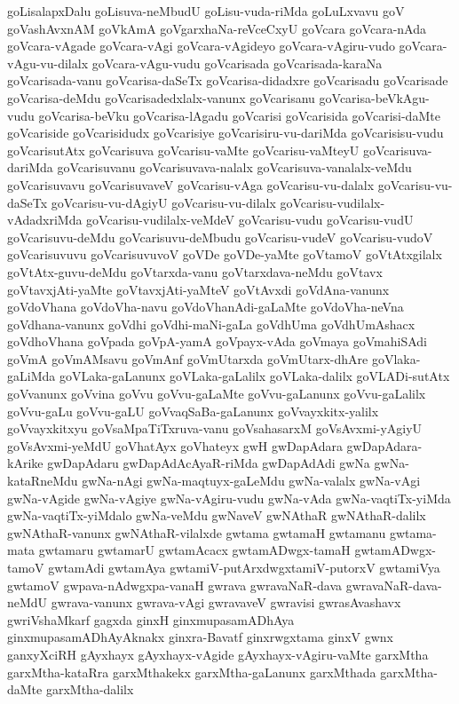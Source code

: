 {goLisalapxDalu
goLisuva-neMbudU
goLisu-vuda-riMda
goLuLxvavu
goV
goVashAvxnAM
goVkAmA
goVgarxhaNa-reVceCxyU
goVcara
goVcara-nAda
goVcara-vAgade
goVcara-vAgi
goVcara-vAgideyo
goVcara-vAgiru-vudo
goVcara-vAgu-vu-dilalx
goVcara-vAgu-vudu
goVcarisada
goVcarisada-karaNa
goVcarisada-vanu
goVcarisa-daSeTx
goVcarisa-didadxre
goVcarisadu
goVcarisade
goVcarisa-deMdu
goVcarisadedxlalx-vanunx
goVcarisanu
goVcarisa-beVkAgu-vudu
goVcarisa-beVku
goVcarisa-lAgadu
goVcarisi
goVcarisida
goVcarisi-daMte
goVcariside
goVcarisidudx
goVcarisiye
goVcarisiru-vu-dariMda
goVcarisisu-vudu
goVcarisutAtx
goVcarisuva
goVcarisu-vaMte
goVcarisu-vaMteyU
goVcarisuva-dariMda
goVcarisuvanu
goVcarisuvava-nalalx
goVcarisuva-vanalalx-veMdu
goVcarisuvavu
goVcarisuvaveV
goVcarisu-vAga
goVcarisu-vu-dalalx
goVcarisu-vu-daSeTx
goVcarisu-vu-dAgiyU
goVcarisu-vu-dilalx
goVcarisu-vudilalx-vAdadxriMda
goVcarisu-vudilalx-veMdeV
goVcarisu-vudu
goVcarisu-vudU
goVcarisuvu-deMdu
goVcarisuvu-deMbudu
goVcarisu-vudeV
goVcarisu-vudoV
goVcarisuvuvu
goVcarisuvuvoV
goVDe
goVDe-yaMte
goVtamoV
goVtAtxgilalx
goVtAtx-guvu-deMdu
goVtarxda-vanu
goVtarxdava-neMdu
goVtavx
goVtavxjAti-yaMte
goVtavxjAti-yaMteV
goVtAvxdi
goVdAna-vanunx
goVdoVhana
goVdoVha-navu
goVdoVhanAdi-gaLaMte
goVdoVha-neVna
goVdhana-vanunx
goVdhi
goVdhi-maNi-gaLa
goVdhUma
goVdhUmAshacx
goVdhoVhana
goVpada
goVpA-yamA
goVpayx-vAda
goVmaya
goVmahiSAdi
goVmA
goVmAMsavu
goVmAnf
goVmUtarxda
goVmUtarx-dhAre
goVlaka-gaLiMda
goVLaka-gaLanunx
goVLaka-gaLalilx
goVLaka-dalilx
goVLADi-sutAtx
goVvanunx
goVvina
goVvu
goVvu-gaLaMte
goVvu-gaLanunx
goVvu-gaLalilx
goVvu-gaLu
goVvu-gaLU
goVvaqSaBa-gaLanunx
goVvayxkitx-yalilx
goVvayxkitxyu
goVsaMpaTiTxruva-vanu
goVsahasarxM
goVsAvxmi-yAgiyU
goVsAvxmi-yeMdU
goVhatAyx
goVhateyx
gwH
gwDapAdara
gwDapAdara-kArike
gwDapAdaru
gwDapAdAcAyaR-riMda
gwDapAdAdi
gwNa
gwNa-kataRneMdu
gwNa-nAgi
gwNa-maqtuyx-gaLeMdu
gwNa-valalx
gwNa-vAgi
gwNa-vAgide
gwNa-vAgiye
gwNa-vAgiru-vudu
gwNa-vAda
gwNa-vaqtiTx-yiMda
gwNa-vaqtiTx-yiMdalo
gwNa-veMdu
gwNaveV
gwNAthaR
gwNAthaR-dalilx
gwNAthaR-vanunx
gwNAthaR-vilalxde
gwtama
gwtamaH
gwtamanu
gwtama-mata
gwtamaru
gwtamarU
gwtamAcacx
gwtamADwgx-tamaH
gwtamADwgx-tamoV
gwtamAdi
gwtamAya
gwtamiV-putArxdwgxtamiV-putorxV
gwtamiVya
gwtamoV
gwpava-nAdwgxpa-vanaH
gwrava
gwravaNaR-dava
gwravaNaR-dava-neMdU
gwrava-vanunx
gwrava-vAgi
gwravaveV
gwravisi
gwrasAvashavx
gwriVshaMkarf
gagxda
ginxH
ginxmupasamADhAya
ginxmupasamADhAyAknakx
ginxra-Bavatf
ginxrwgxtama
ginxV
gwnx
ganxyXciRH
gAyxhayx
gAyxhayx-vAgide
gAyxhayx-vAgiru-vaMte
garxMtha
garxMtha-kataRra
garxMthakekx
garxMtha-gaLanunx
garxMthada
garxMtha-daMte
garxMtha-dalilx
}
